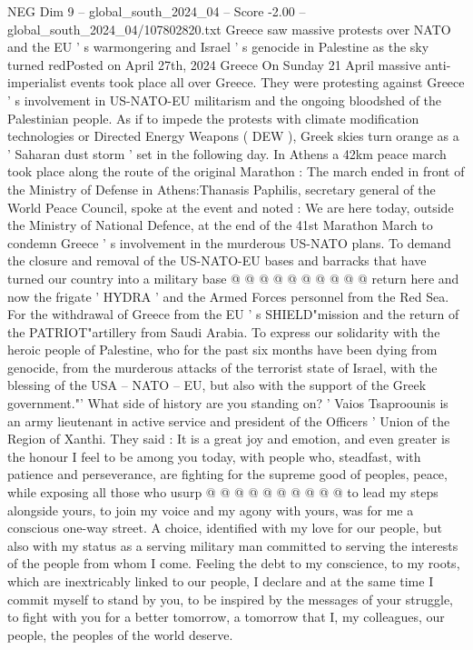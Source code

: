 \begin{textsample}{NEG Dim 9 – global\_south\_2024\_04 – Score -2.00 – global\_south\_2024\_04/107802820.txt}  \label{ex:f9_neg_380}
Greece saw massive protests over NATO and the EU ' s warmongering and Israel ' s genocide in Palestine as the sky turned redPosted on April 27th, 2024 Greece On Sunday 21 April massive anti-imperialist events took place all over Greece.
They were protesting against Greece ' s involvement in US-NATO-EU militarism and the ongoing bloodshed of the Palestinian people.
As if to impede the protests with climate modification technologies or Directed Energy Weapons ( DEW ), Greek skies turn orange as a ' Saharan dust storm ' set in the following day.
In Athens a 42km peace march took place along the route of the original Marathon : The march ended in front of the Ministry of Defense in Athens:Thanasis Paphilis, secretary general of the World Peace Council, spoke at the event and noted : We are here today, outside the Ministry of National Defence, at the end of the 41st Marathon March to condemn Greece ' s involvement in the murderous US-NATO plans.
To demand the closure and removal of the US-NATO-EU bases and barracks that have turned our country into a military base @ @ @ @ @ @ @ @ @ @ return here and now the frigate ' HYDRA ' and the Armed Forces personnel from the Red Sea.
For the withdrawal of Greece from the EU ' s SHIELD"mission and the return of the PATRIOT"artillery from Saudi Arabia.
To express our solidarity with the heroic people of Palestine, who for the past six months have been dying from genocide, from the murderous attacks of the terrorist state of Israel, with the blessing of the USA -- NATO -- EU, but also with the support of the Greek government."' What side of history are you standing on? ' Vaios Tsaproounis is an army lieutenant in active service and president of the Officers ' Union of the Region of Xanthi.
They said : It is a great joy and emotion, and even greater is the honour I feel to be among you today, with people who, steadfast, with patience and perseverance, are fighting for the supreme good of peoples, peace, while exposing all those who usurp @ @ @ @ @ @ @ @ @ @ to lead my steps alongside yours, to join my voice and my agony with yours, was for me a conscious one-way street.
A choice, identified with my love for our people, but also with my status as a serving military man committed to serving the interests of the people from whom I come.
Feeling the debt to my conscience, to my roots, which are inextricably linked to our people, I declare and at the same time I commit myself to stand by you, to be inspired by the messages of your struggle, to fight with you for a better tomorrow, a tomorrow that I, my colleagues, our people, the peoples of the world deserve.

\end{textsample}

